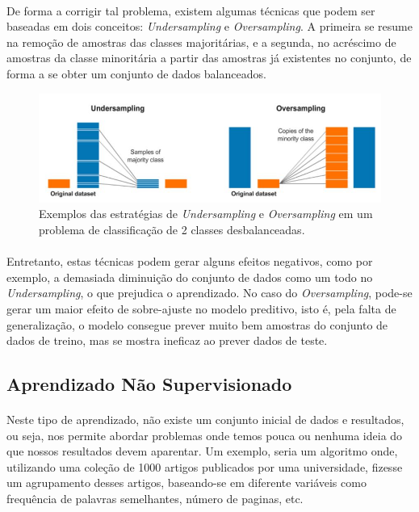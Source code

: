 \documentclass[grad,numbers]{coppe}
\begin{document}
  			\paragraph{}De forma a corrigir tal problema, existem algumas técnicas que podem ser baseadas em dois conceitos: \textit{Undersampling} e \textit{Oversampling}. A primeira se resume na remoção de amostras das classes majoritárias, e a segunda, no acréscimo de amostras da classe minoritária a partir das amostras já existentes no conjunto, de forma a se obter um conjunto de dados balanceados.
  			\newpage
  			\begin{figure}[h]
  				\centering
  				\includegraphics[width=13cm]{os_and_us.jpg}
  				\caption{Exemplos das estratégias de \textit{Undersampling} e \textit{Oversampling} em um problema de classificação de 2 classes desbalanceadas\cite{os_and_us}.}
  				\label{fig:os_and_us}
  			\end{figure}
  			\paragraph{}Entretanto, estas técnicas podem gerar alguns efeitos negativos, como por exemplo, a demasiada diminuição do conjunto de dados como um todo no \textit{Undersampling}, o que prejudica o aprendizado. No caso do \textit{Oversampling}, pode-se gerar um maior efeito de sobre-ajuste no modelo preditivo, isto é, pela falta de generalização, o modelo consegue prever muito bem amostras do conjunto de dados de treino, mas se mostra ineficaz ao prever dados de teste.
		\subsection{Aprendizado Não Supervisionado}
			\paragraph{}Neste tipo de aprendizado, não existe um conjunto inicial de dados e resultados, ou seja, nos permite abordar problemas onde temos pouca ou nenhuma ideia do que nossos resultados devem aparentar. Um exemplo, seria um algoritmo onde, utilizando uma coleção de 1000 artigos publicados por uma universidade, fizesse um agrupamento desses artigos, baseando-se em diferente variáveis como frequência de palavras semelhantes, número de paginas, etc.
\end{document}
